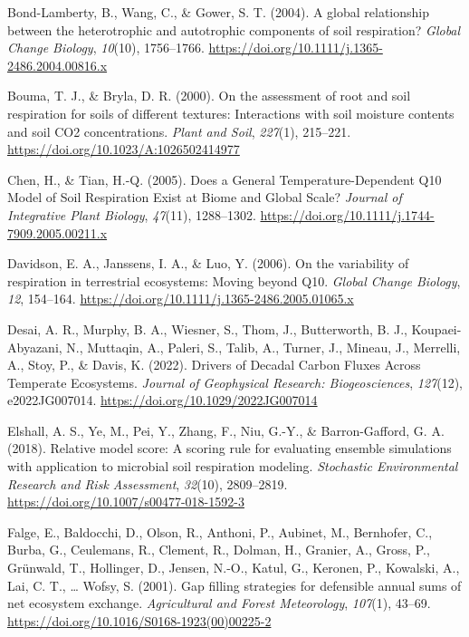 \documentclass[
  letterpaper,
  DIV=11,
  numbers=noendperiod]{scrartcl}
\newlength{\cslhangindent}
\newenvironment{CSLReferences}[2] %
 {\begin{list}{}{%
  \setlength{\itemindent}{0pt}
  \setlength{\leftmargin}{0pt}
  \setlength{\parsep}{0pt}
  \ifodd #1
   \setlength{\leftmargin}{\cslhangindent}
   \setlength{\itemindent}{-1\cslhangindent}
  \fi
  \setlength{\itemsep}{#2\baselineskip}}}
 {\end{list}}
\begin{document}
\begin{CSLReferences}{1}{0}
Bond-Lamberty, B., Wang, C., \& Gower, S. T. (2004). A global
relationship between the heterotrophic and autotrophic components of
soil respiration? \emph{Global Change Biology}, \emph{10}(10),
1756--1766. \url{https://doi.org/10.1111/j.1365-2486.2004.00816.x}

Bouma, T. J., \& Bryla, D. R. (2000). On the assessment of root and soil
respiration for soils of different textures: Interactions with soil
moisture contents and soil {CO2} concentrations. \emph{Plant and Soil},
\emph{227}(1), 215--221. \url{https://doi.org/10.1023/A:1026502414977}

Chen, H., \& Tian, H.-Q. (2005). Does a {General Temperature-Dependent
Q10 Model} of {Soil Respiration Exist} at {Biome} and {Global Scale}?
\emph{Journal of Integrative Plant Biology}, \emph{47}(11), 1288--1302.
\url{https://doi.org/10.1111/j.1744-7909.2005.00211.x}

Davidson, E. A., Janssens, I. A., \& Luo, Y. (2006). On the variability
of respiration in terrestrial ecosystems: Moving beyond {Q10}.
\emph{Global Change Biology}, \emph{12}, 154--164.
\url{https://doi.org/10.1111/j.1365-2486.2005.01065.x}

Desai, A. R., Murphy, B. A., Wiesner, S., Thom, J., Butterworth, B. J.,
Koupaei-Abyazani, N., Muttaqin, A., Paleri, S., Talib, A., Turner, J.,
Mineau, J., Merrelli, A., Stoy, P., \& Davis, K. (2022). Drivers of
{Decadal Carbon Fluxes Across Temperate Ecosystems}. \emph{Journal of
Geophysical Research: Biogeosciences}, \emph{127}(12), e2022JG007014.
\url{https://doi.org/10.1029/2022JG007014}

Elshall, A. S., Ye, M., Pei, Y., Zhang, F., Niu, G.-Y., \&
Barron-Gafford, G. A. (2018). Relative model score: A scoring rule for
evaluating ensemble simulations with application to microbial soil
respiration modeling. \emph{Stochastic Environmental Research and Risk
Assessment}, \emph{32}(10), 2809--2819.
\url{https://doi.org/10.1007/s00477-018-1592-3}

Falge, E., Baldocchi, D., Olson, R., Anthoni, P., Aubinet, M.,
Bernhofer, C., Burba, G., Ceulemans, R., Clement, R., Dolman, H.,
Granier, A., Gross, P., Grünwald, T., Hollinger, D., Jensen, N.-O.,
Katul, G., Keronen, P., Kowalski, A., Lai, C. T., \ldots{} Wofsy, S.
(2001). Gap filling strategies for defensible annual sums of net
ecosystem exchange. \emph{Agricultural and Forest Meteorology},
\emph{107}(1), 43--69.
\url{https://doi.org/10.1016/S0168-1923(00)00225-2}


\end{CSLReferences}
\end{document}
